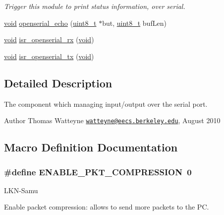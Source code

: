 \begin{DoxyCompactItemize}
\begin{DoxyCompactList}\small\item\em Trigger this module to print status information, over serial. \end{DoxyCompactList}\item 
\hyperlink{usb__devapi_8h_afabf60e7f57651d6d595a02c75f07cd0}{void} \hyperlink{group___open_serial_gac066477656140104a2b4e9b23b5371e2}{openserial\+\_\+echo} (\hyperlink{_p_e___types_8h_aba7bc1797add20fe3efdf37ced1182c5}{uint8\+\_\+t} $\ast$but, \hyperlink{_p_e___types_8h_aba7bc1797add20fe3efdf37ced1182c5}{uint8\+\_\+t} buf\+Len)
\item 
\hyperlink{usb__devapi_8h_afabf60e7f57651d6d595a02c75f07cd0}{void} \hyperlink{group___open_serial_ga253b4f5bec2de8f4f03c1732154cfd65}{isr\+\_\+openserial\+\_\+rx} (\hyperlink{usb__devapi_8h_afabf60e7f57651d6d595a02c75f07cd0}{void})
\item 
\hyperlink{usb__devapi_8h_afabf60e7f57651d6d595a02c75f07cd0}{void} \hyperlink{group___open_serial_ga4ac33c65ec6383bfa7df3e7b57d0b60e}{isr\+\_\+openserial\+\_\+tx} (\hyperlink{usb__devapi_8h_afabf60e7f57651d6d595a02c75f07cd0}{void})
\end{DoxyCompactItemize}


\subsection{Detailed Description}
The component which managing input/output over the serial port. 

\begin{DoxyAuthor}{Author}
Thomas Watteyne \href{mailto:watteyne@eecs.berkeley.edu}{\tt watteyne@eecs.\+berkeley.\+edu}, August 2010 
\end{DoxyAuthor}


\subsection{Macro Definition Documentation}
\subsubsection[{\texorpdfstring{E\+N\+A\+B\+L\+E\+\_\+\+P\+K\+T\+\_\+\+C\+O\+M\+P\+R\+E\+S\+S\+I\+ON}{ENABLE_PKT_COMPRESSION}}]{\setlength{\rightskip}{0pt plus 5cm}\#define E\+N\+A\+B\+L\+E\+\_\+\+P\+K\+T\+\_\+\+C\+O\+M\+P\+R\+E\+S\+S\+I\+ON~0}\hypertarget{group___open_serial_ga6499f570e793bb2111f482628e521a1b}{}\label{group___open_serial_ga6499f570e793bb2111f482628e521a1b}
\begin{DoxyRefDesc}{L\+K\+N-\/\+Samu}
\item[\hyperlink{_l_k_n_code_edits__LKN_code_edits000003}{L\+K\+N-\/\+Samu}]Enable packet compression\+: allows to send more packets to the PC. \end{DoxyRefDesc}


